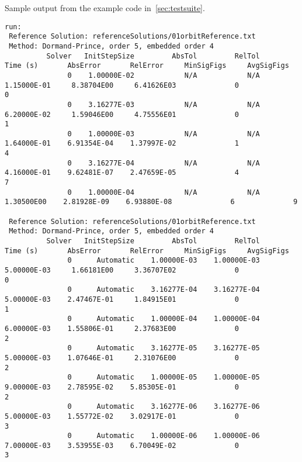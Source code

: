\documentclass[10pt,letterpaper]{article}
\begin{document}
Sample output from the example code in~\ref{sec:testsuite}.
{\tiny
\begin{verbatim}
run:
 Reference Solution: referenceSolutions/01orbitReference.txt
 Method: Dormand-Prince, order 5, embedded order 4
          Solver   InitStepSize         AbsTol         RelTol       Time (s)       AbsError       RelError     MinSigFigs     AvgSigFigs
               0    1.00000E-02            N/A            N/A    1.15000E-01     8.38704E00     6.41626E03              0              0
               0    3.16277E-03            N/A            N/A    6.20000E-02     1.59046E00     4.75556E01              0              1
               0    1.00000E-03            N/A            N/A    1.64000E-01    6.91354E-04    1.37997E-02              1              4
               0    3.16277E-04            N/A            N/A    4.16000E-01    9.62481E-07    2.47659E-05              4              7
               0    1.00000E-04            N/A            N/A     1.30500E00    2.81928E-09    6.93880E-08              6              9

 Reference Solution: referenceSolutions/01orbitReference.txt
 Method: Dormand-Prince, order 5, embedded order 4
          Solver   InitStepSize         AbsTol         RelTol       Time (s)       AbsError       RelError     MinSigFigs     AvgSigFigs
               0      Automatic    1.00000E-03    1.00000E-03    5.00000E-03     1.66181E00     3.36707E02              0              0
               0      Automatic    3.16277E-04    3.16277E-04    5.00000E-03    2.47467E-01     1.84915E01              0              1
               0      Automatic    1.00000E-04    1.00000E-04    6.00000E-03    1.55806E-01     2.37683E00              0              2
               0      Automatic    3.16277E-05    3.16277E-05    5.00000E-03    1.07646E-01     2.31076E00              0              2
               0      Automatic    1.00000E-05    1.00000E-05    9.00000E-03    2.78595E-02    5.85305E-01              0              2
               0      Automatic    3.16277E-06    3.16277E-06    5.00000E-03    1.55772E-02    3.02917E-01              0              3
               0      Automatic    1.00000E-06    1.00000E-06    7.00000E-03    3.53955E-03    6.70049E-02              0              3


\end{verbatim}}
\end{document}
